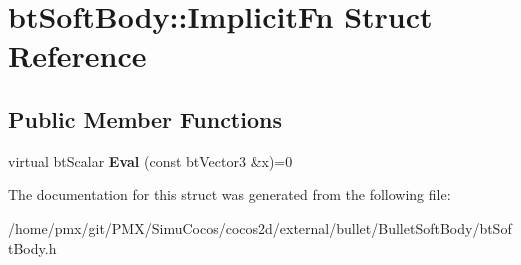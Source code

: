 \hypertarget{structbtSoftBody_1_1ImplicitFn}{}\section{bt\+Soft\+Body\+:\+:Implicit\+Fn Struct Reference}
\label{structbtSoftBody_1_1ImplicitFn}
\subsection*{Public Member Functions}
\begin{DoxyCompactItemize}
\item 
\mbox{\label{structbtSoftBody_1_1ImplicitFn_a3bbaaae0b8f0c1baf636ebfcfd66b482}} 
virtual bt\+Scalar {\bfseries Eval} (const bt\+Vector3 \&x)=0
\end{DoxyCompactItemize}


The documentation for this struct was generated from the following file\+:\begin{DoxyCompactItemize}
\item 
/home/pmx/git/\+P\+M\+X/\+Simu\+Cocos/cocos2d/external/bullet/\+Bullet\+Soft\+Body/bt\+Soft\+Body.\+h\end{DoxyCompactItemize}
